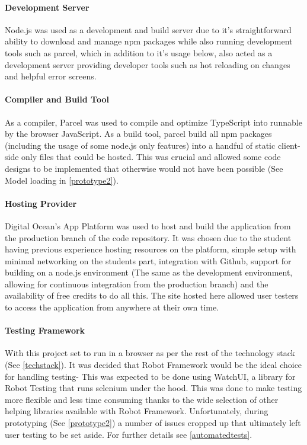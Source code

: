\paragraph{Development Server}
Node.js was used as a development and build server due to it's straightforward ability to download and manage npm packages while also running development tools such as parcel, which in addition to it's usage below, also acted as a development server providing developer tools such as hot reloading on changes and helpful error screens.

\paragraph{Compiler and Build Tool}
As a compiler, Parcel was used to compile and optimize TypeScript into runnable by the browser JavaScript. As a build tool, parcel build all npm packages (including the usage of some node.js only features) into a handful of static client-side only files that could be hosted. This was crucial and allowed some code designs to be implemented that otherwise would not have been possible (See Model loading in \ref{prototype2}).

\paragraph{Hosting Provider}
Digital Ocean's App Platform was used to host and build the application from the production branch of the code repository. It was chosen due to the student having previous experience hosting resources on the platform, simple setup with minimal networking on the students part, integration with Github, support for building on a node.js environment (The same as the development environment, allowing for continuous integration from the production branch) and the availability of free credits to do all this. The site hosted here allowed user testers to access the application from anywhere at their own time.

\paragraph{Testing Framework} \label{testframe}
With this project set to run in a browser as per the rest of the technology stack (See \ref{techstack}). It was decided that Robot Framework would be the ideal choice for handling testing- This was expected to be done using WatchUI, a library for Robot Testing that runs selenium under the hood. This was done to make testing more flexible and less time consuming thanks to the wide selection of other helping libraries available with Robot Framework. Unfortunately, during prototyping (See \ref{prototype2}) a number of issues cropped up that ultimately left user testing to be set aside. For further details see \ref{automatedtests}.

